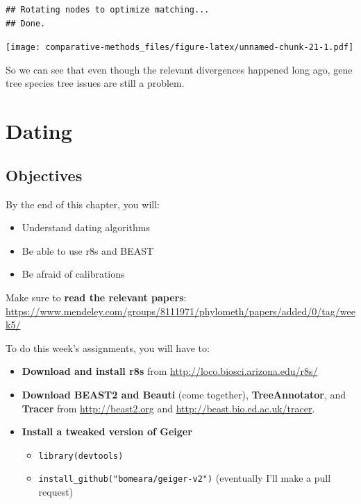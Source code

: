 \documentclass[]{book}
\providecommand{\tightlist}{%
  \setlength{\itemsep}{0pt}\setlength{\parskip}{0pt}}
\theoremstyle{definition}
\theoremstyle{definition}
\theoremstyle{remark}
\begin{document}
\begin{verbatim}
## Rotating nodes to optimize matching...
## Done.
\end{verbatim}

\texttt{[image: comparative-methods\_files/figure-latex/unnamed-chunk-21-1.pdf]}

So we can see that even though the relevant divergences happened long
ago, gene tree species tree issues are still a problem.

\chapter{Dating}\label{dating}

\section{Objectives}\label{objectives-7}

By the end of this chapter, you will:

\begin{itemize}
\tightlist
\item
  Understand dating algorithms
\item
  Be able to use r8s and BEAST
\item
  Be afraid of calibrations
\end{itemize}

Make sure to \textbf{read the relevant papers}:
\url{https://www.mendeley.com/groups/8111971/phylometh/papers/added/0/tag/week5/}

To do this week's assignments, you will have to:

\begin{itemize}
\tightlist
\item
  \textbf{Download and install r8s} from
  \url{http://loco.biosci.arizona.edu/r8s/}
\item
  \textbf{Download BEAST2 and Beauti} (come together),
  \textbf{TreeAnnotator}, and \textbf{Tracer} from
  \url{http://beast2.org} and \url{http://beast.bio.ed.ac.uk/tracer}.
\item
  \textbf{Install a tweaked version of Geiger}

  \begin{itemize}
  \tightlist
  \item
    \texttt{library(devtools)}
  \item
    \texttt{install\_github("bomeara/geiger-v2")} (eventually I'll make
    a pull request)
  \end{itemize}
\end{itemize}
\end{document}

